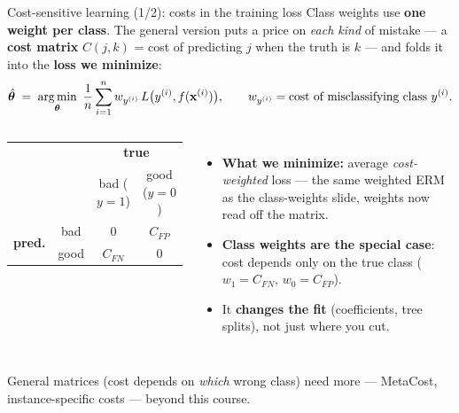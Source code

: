 \documentclass[aspectratio=169]{beamer}
\begin{document}
\begin{frame}{Cost-sensitive learning (1/2): costs in the training loss}
  Class weights use \textbf{one weight per class}. The general version puts a price on \emph{each
  kind} of mistake --- a \textbf{cost matrix} $C(j,k)$ = cost of predicting $j$ when the truth is
  $k$ --- and folds it into the \textbf{loss we minimize}:
  \[ \hat{\bm{\theta}} \;=\; \mathop{\mathrm{arg\,min}}_{\bm{\theta}}\ \frac1n \sum_{i=1}^{n} w_{y^{(i)}}\, L\big(y^{(i)}, f(\mathbf{x}^{(i)})\big),
     \qquad w_{y^{(i)}} = \text{cost of misclassifying class } y^{(i)}. \]
  \begin{columns}[T]
    \begin{center}\small
      \renewcommand{\arraystretch}{1.2}
      \begin{tabular}{cc|cc}
        & & \multicolumn{2}{c}{\textbf{true}} \\
        & & bad ($y{=}1$) & good ($y{=}0$) \\
        \hline
        \multirow{2}{*}{\textbf{pred.}} & bad & $0$ & $C_{FP}$ \\
        & good & $C_{FN}$ & $0$ \\
      \end{tabular}
    \end{center}
    \begin{itemize}\small
      \item \textbf{What we minimize:} average \emph{cost-weighted} loss --- the same weighted ERM
        as the class-weights slide, weights now read off the matrix.
      \item \textbf{Class weights are the special case}: cost depends only on the true class
        ($w_1{=}C_{FN}$, $w_0{=}C_{FP}$).
      \item It \textbf{changes the fit} (coefficients, tree splits), not just where you cut.
    \end{itemize}
  \end{columns}
  \vskip 2pt
  \footnotesize General matrices (cost depends on \emph{which} wrong class) need more --- MetaCost, instance-specific costs --- beyond this course.
\end{frame}
\end{document}
